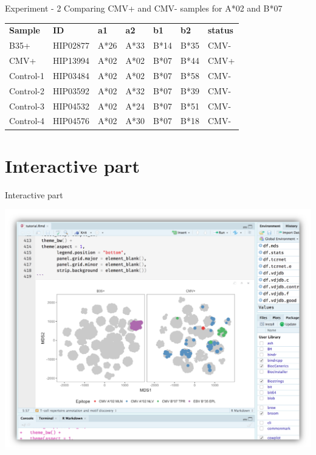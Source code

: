 \documentclass[12pt]{beamer}
\begin{document}
\begin{frame}{Experiment - 2}
Comparing CMV+ and CMV- samples for A*02 and B*07
\begin{table}[]
\begin{tabular}{lllllll}
\textbf{Sample} & \textbf{ID} & \textbf{a1}                  & \textbf{a2} & \textbf{b1}                  & \textbf{b2} & \textbf{status}              \\
B35+            & HIP02877    & A*26                         & A*33        & B*14                         & B*35        & CMV-                         \\
CMV+            & HIP13994    & \cellcolor[HTML]{FFC702}A*02 & A*02        & \cellcolor[HTML]{FFC702}B*07 & B*44        & \cellcolor[HTML]{FFC702}CMV+ \\
Control-1       & HIP03484    & \cellcolor[HTML]{9698ED}A*02 & A*02        & \cellcolor[HTML]{9698ED}B*07 & B*58        & \cellcolor[HTML]{9698ED}CMV- \\
Control-2       & HIP03592    & \cellcolor[HTML]{9698ED}A*02 & A*32        & \cellcolor[HTML]{9698ED}B*07 & B*39        & \cellcolor[HTML]{9698ED}CMV- \\
Control-3       & HIP04532    & \cellcolor[HTML]{9698ED}A*02 & A*24        & \cellcolor[HTML]{9698ED}B*07 & B*51        & \cellcolor[HTML]{9698ED}CMV- \\
Control-4       & HIP04576    & \cellcolor[HTML]{9698ED}A*02 & A*30        & \cellcolor[HTML]{9698ED}B*07 & B*18        & \cellcolor[HTML]{9698ED}CMV-
\end{tabular}
\end{table}
\end{frame}

\section{Interactive part}

\begin{frame}{Interactive part}
\begin{center}
\includegraphics[width=\textwidth]{../splash}
\end{center}
\end{frame}
\end{document}
